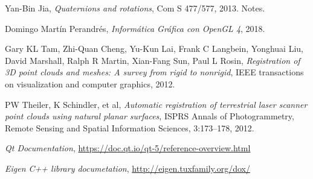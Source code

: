\documentclass[a4paper,11pt]{book}
\begin{document}
\begin{thebibliography}{X}
	 Yan-Bin Jia, \textsl{Quaternions and rotations}, Com S 477/577, 2013.
	Notes.
		
	 Domingo Martín Perandrés, \textsl{Informática Gráfica con OpenGL 4}, 2018.
	
	 Gary KL Tam, Zhi-Quan Cheng, Yu-Kun Lai, Frank C Langbein, Yonghuai Liu, David Marshall, Ralph R Martin, Xian-Fang Sun, Paul L Rosin, \textsl{Registration of 3D point clouds and meshes: A survey from rigid to nonrigid}, IEEE transactions on visualization and computer graphics, 2012.
			
	 PW Theiler, K Schindler, et al, \textsl{Automatic registration of terrestrial laser scanner point clouds using natural planar surfaces}, ISPRS Annals of Photogrammetry, Remote Sensing and Spatial	Information Sciences, 3:173–178, 2012.
	
	 \textsl{Qt Documentation}, \url{https://doc.qt.io/qt-5/reference-overview.html}
	
	 \textsl{Eigen C++ library documetation}, \url{http://eigen.tuxfamily.org/dox/}
\end{thebibliography}

%
%
%
%
%
%
%
%
%
%
%
%
%
%
%
%
%
%
%
%
%
\end{document}
